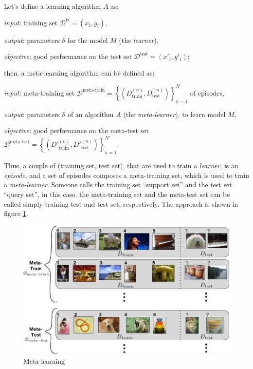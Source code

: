 Let's define a learning algorithm $A$ as:
\begin{myitem}
    \item \textit{input}: training set $\mathcal{D}^{\text{tr}} = {(x_i, y_i)}$,
    \item \textit{output}: parameters $\theta$ for the model $M$ (the \textit{learner}),
    \item \textit{objective}: good performance on the test set $\mathcal{D}^{\text{test}} = {(x'_i, y'_i)}$;
\end{myitem}
then, a meta-learning algorithm can be defined as:
\begin{myitem}
    \item \textit{input}: meta-training set $\mathcal{D}^{\text{meta-train}} = \left\{\left(D_{\text{train}}^{(n)}, D_{\text{test}}^{(n)}\right)\right\}_{n=1}
    ^N$ of episodes,
    \item \textit{output}: parameters $\theta$ of an algorithm $A$ (the \textit{meta-learner}), to learn model $M$,
    \item \textit{objective}: good performance on the meta-test set $\mathcal{D}^{\text{meta-test}} = \left\{\left({D'}_{\text{train}}^{(n)}, {D'}_{\text{test}}^{(n)}\right)\right\}_{n=1}^{N'}$.
\end{myitem}
Thus, a couple of (training set, test set), that are used to train a \textit{learner}, is an \textit{episode}, and a set of episodes composes a meta-training set, which is used to train a \textit{meta-learner}.
Someone calls the training set ``support set'' and the test set ``query set'', in this case, the meta-training set and the meta-test set can be called simply training test and test set, respectively.
The approach is shown in figure \ref{fig:mm-meta-learning}.

\begin{figure}[h!]
    \centering
    \includegraphics[width=0.6\linewidth]{images/mm-meta-learning}
    \caption[Meta-learning]{Meta-learning}
    \label{fig:mm-meta-learning}
\end{figure}

